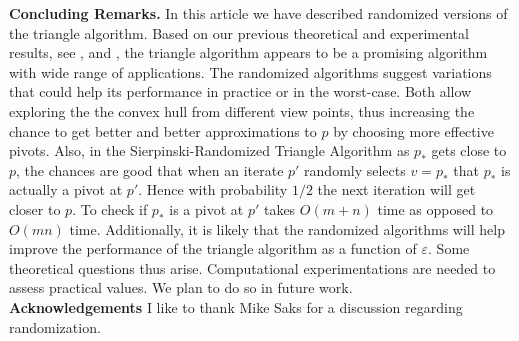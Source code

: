 \documentclass{article}
\theoremstyle{definition}
\begin{document}
{\bf Concluding Remarks.} In this article we have described randomized versions of the triangle algorithm.  Based on our previous theoretical and experimental  results,  see \cite{kal14}, \cite{Meng} and \cite{Gibson}, the triangle algorithm appears to be a promising algorithm with wide range of applications.  The randomized algorithms suggest variations that could help its performance in practice or in the worst-case.  Both allow exploring the the convex hull from different view points, thus increasing the chance to get better and better approximations to $p$ by choosing more effective pivots.  Also, in the Sierpinski-Randomized Triangle Algorithm as $p_*$ gets close to $p$, the chances are good that when an iterate $p'$ randomly selects $v=p_*$ that $p_*$ is actually a pivot at $p'$. Hence with probability $1/2$ the next iteration will get closer to $p$. To check if $p_*$ is a pivot at $p'$ takes $O(m+n)$ time as opposed to $O(mn)$ time. Additionally, it is likely that the randomized algorithms will help improve the performance of the triangle algorithm as a function of  $\varepsilon$.
Some theoretical questions thus arise. Computational experimentations are needed to assess practical values.  We plan to do so in future work.\\

{\bf Acknowledgements}  I like to thank Mike Saks for a discussion regarding randomization.
\end{document}

